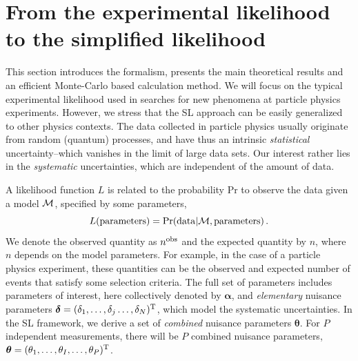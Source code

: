 \documentclass[11pt]{article}
\newcommand{\be}{\begin{equation}}
\newcommand{\ee}{\end{equation}}
\begin{document}


\section{From the experimental likelihood to the simplified likelihood}
\label{se:EL_SL}

This section introduces the formalism, presents the main theoretical results and an efficient Monte-Carlo based calculation method. We will focus on the typical experimental likelihood used in searches for new phenomena at particle physics experiments. However, we stress that the SL approach can be easily generalized to other physics contexts.
The data collected in particle physics usually originate from random (quantum) processes, and have thus an intrinsic \textit{statistical} uncertainty--which vanishes in the limit of large data sets. Our interest rather lies in the \textit{systematic} uncertainties, which are independent of the amount of data.


A likelihood function $L$ is related to the probability Pr to observe the data given a model $\cal M$, specified by some parameters,
\be L({\rm parameters})={\rm Pr}({\rm data}|{\cal M},{\rm parameters})\,.\ee
We denote the observed  quantity as $n^{\rm obs}$ and the expected quantity by $n$, where $n$ depends on the model parameters.   For example, in the case of
a particle physics experiment, these quantities can be the observed and expected number of events that satisfy some selection criteria.
The full set of parameters includes parameters of interest, here collectively denoted by $\bm{\alpha}$, and \textit{elementary} nuisance parameters $\bm{\delta}=(\delta_1,\ldots,\delta_{j}\ldots,\delta_N)^{\rm{T}}$, which model the systematic uncertainties.
In the SL framework, we derive a set of \textit{combined} nuisance parameters $\bm{\theta}$. For $P$ independent measurements, there will be $P$ combined nuisance parameters, $\bm{\theta}=(\theta_1,\ldots,\theta_{I},\ldots,\theta_P)^{\rm{T}}$.
\end{document}
